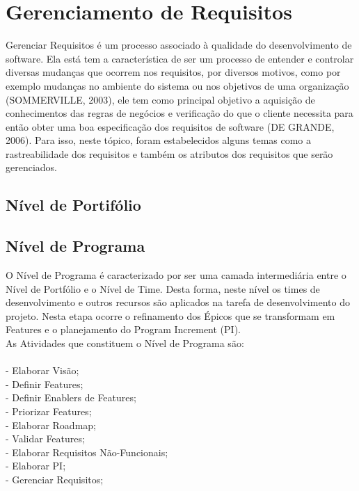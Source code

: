 \chapter[Gerenciamento de Requisitos]{Gerenciamento de Requisitos}

Gerenciar Requisitos é um processo associado à qualidade do desenvolvimento de software. Ela está tem a característica de ser um processo de entender e controlar diversas mudanças que ocorrem nos requisitos, por diversos motivos, como por exemplo mudanças no ambiente do sistema ou nos objetivos de uma organização (SOMMERVILLE, 2003), ele tem como principal objetivo a aquisição de conhecimentos das regras de negócios e verificação do que o cliente necessita para então obter uma boa especificação dos requisitos de software (DE GRANDE, 2006). Para isso, neste tópico, foram estabelecidos alguns temas como a rastreabilidade dos requisitos e também os atributos dos requisitos que serão gerenciados.
\\
\section{Nível de Portifólio}

\section{Nível de Programa}
O Nível de Programa é caracterizado por ser uma camada intermediária entre o Nível de Portfólio e o Nível de Time. Desta forma, neste nível os times de desenvolvimento e outros recursos são aplicados na tarefa de desenvolvimento do projeto.  Nesta etapa ocorre o refinamento dos Épicos que se transformam em Features e o planejamento do Program Increment (PI).\\
\tab As Atividades que constituem o Nível de Programa são:\\
\\
\tab - Elaborar Visão;\\
\tab - Definir Features;\\
\tab - Definir Enablers de Features;\\
\tab - Priorizar Features;\\
\tab - Elaborar Roadmap;\\
\tab - Validar Features;\\
\tab - Elaborar Requisitos Não-Funcionais;\\
\tab - Elaborar PI;\\
\tab - Gerenciar Requisitos;\\

